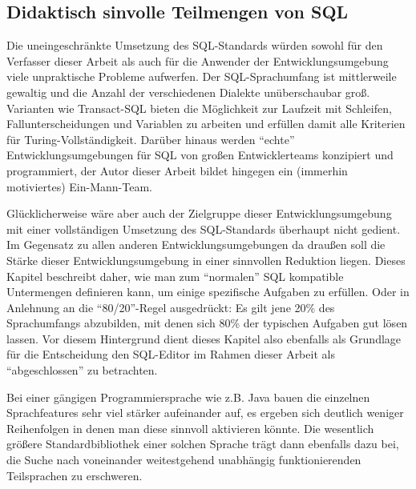 \subsection{Didaktisch sinvolle Teilmengen von SQL}
\label{sec:sql-subset}


Die uneingeschränkte Umsetzung des SQL-Standards würden sowohl für den Verfasser dieser Arbeit als auch für die Anwender der Entwicklungsumgebung viele unpraktische Probleme aufwerfen. Der SQL-Sprachumfang ist mittlerweile gewaltig und die Anzahl der verschiedenen Dialekte unüberschaubar groß. Varianten wie Transact-SQL bieten die Möglichkeit zur Laufzeit mit Schleifen, Fallunterscheidungen und Variablen zu arbeiten und erfüllen damit alle Kriterien für Turing-Vollständigkeit. Darüber hinaus werden ``echte'' Entwicklungsumgebungen für SQL von großen Entwicklerteams konzipiert und programmiert, der Autor dieser Arbeit bildet hingegen ein (immerhin motiviertes) Ein-Mann-Team.

Glücklicherweise wäre aber auch der Zielgruppe dieser Entwicklungsumgebung mit einer vollständigen Umsetzung des SQL-Standards überhaupt nicht gedient. Im Gegensatz zu allen anderen Entwicklungsumgebungen da draußen soll die Stärke dieser Entwicklungsumgebung in einer sinnvollen Reduktion liegen. Dieses Kapitel beschreibt daher, wie man zum ``normalen'' SQL kompatible Untermengen definieren kann, um einige spezifische Aufgaben zu erfüllen. Oder in Anlehnung an die "`80/20"'-Regel ausgedrückt: Es gilt jene 20\% des Sprachumfangs abzubilden, mit denen sich 80\% der typischen Aufgaben gut lösen lassen. Vor diesem Hintergrund dient dieses Kapitel also ebenfalls als Grundlage für die Entscheidung den SQL-Editor im Rahmen dieser Arbeit als "`abgeschlossen"' zu betrachten.

Bei einer gängigen Programmiersprache wie z.B. Java bauen die einzelnen Sprachfeatures sehr viel stärker aufeinander auf, es ergeben sich deutlich weniger Reihenfolgen in denen man diese sinnvoll aktivieren könnte. Die wesentlich größere Standardbibliothek einer solchen Sprache trägt dann ebenfalls dazu bei, die Suche nach voneinander weitestgehend unabhängig funktionierenden Teilsprachen zu erschweren.

